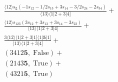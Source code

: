 \documentclass[varwidth, border=5pt]{standalone}
\begin{document}
\begin{my}
$\begin{gathered}
\scriptscriptstyle\frac{⟨12⟩s_{𝟓}(-1s_{12}-1/2s_{13}+3s_{14}-3/2s_{24}-2s_{34})}{⟨13⟩⟨1|2+3|4]} +\\
\scriptscriptstyle\frac{⟨12⟩s_{123}(3s_{12}+3s_{13}+3s_{14}-3s_{23})}{⟨13⟩⟨1|2+3|4]} +\\
\scriptscriptstyle\frac{3⟨12⟩⟨1|2+3|1]⟨1|𝟓|1]}{⟨13⟩⟨1|2+3|4]} +\\
\scriptscriptstyle(3412𝟓,\;\text{False}) +\\
\scriptscriptstyle(2143𝟓,\;\text{True}) +\\
\scriptscriptstyle(4321𝟓,\;\text{True}) \phantom{+}
\end{gathered}$
\end{my}
\end{document}
